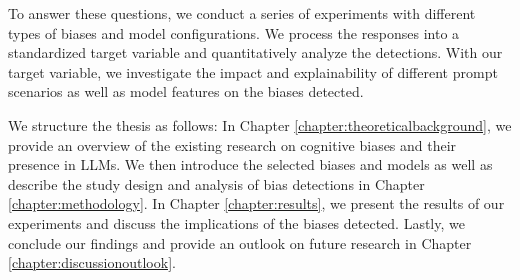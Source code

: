 \par To answer these questions, we conduct a series of experiments with different types of biases and model configurations. We process the responses into a standardized target variable and quantitatively analyze the detections. With our target variable, we investigate the impact and explainability of different prompt scenarios as well as model features on the biases detected.

\par We structure the thesis as follows: In Chapter \ref{chapter:theoreticalbackground}, we provide an overview of the existing research on cognitive biases and their presence in LLMs. We then introduce the selected biases and models as well as describe the study design and analysis of bias detections in Chapter \ref{chapter:methodology}. In Chapter \ref{chapter:results}, we present the results of our experiments and discuss the implications of the biases detected. Lastly, we conclude our findings and provide an outlook on future research in Chapter \ref{chapter:discussionoutlook}.